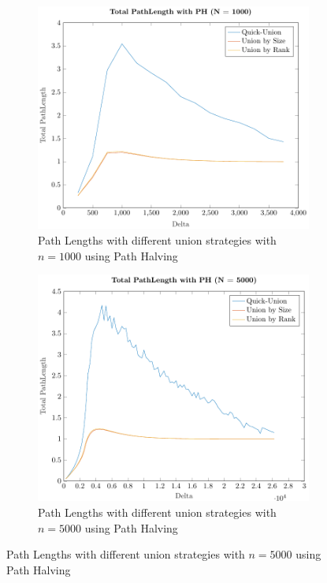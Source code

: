 \begin{figure}[ht]
    \begin{subfigure}{0.32\textwidth}
        \centering
        \includegraphics[width=\textwidth]{../images/plotPHFull1000_PathLength.pdf}
        \caption{Path Lengths with different union strategies with $n = 1000$ using Path Halving}
    \end{subfigure}%
    \hfill
    \begin{subfigure}{0.32\textwidth}
        \centering
        \includegraphics[width=\textwidth]{../images/plotPHFull5000_PathLength.pdf}
        \caption{Path Lengths with different union strategies with $n = 5000$ using Path Halving}

\end{subfigure}
\end{figure}
